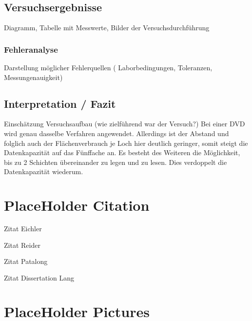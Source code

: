 \documentclass[9pt,twocolumn,twoside]{pnas-new}
\begin{document}
\section*{Versuchsergebnisse}
Diagramm, Tabelle mit Messwerte, Bilder der Versuchsdurchführung

\subsection*{Fehleranalyse}
Darstellung möglicher Fehlerquellen ( Laborbedingungen, Toleranzen, Messungenauigkeit)

\section*{Interpretation / Fazit}

Einschätzung Versuchsaufbau (wie zielführend war der Versuch?)
Bei einer DVD wird genau dasselbe Verfahren angewendet. Allerdings ist der Abstand und folglich auch der Flächenverbrauch je Loch hier deutlich geringer, somit steigt die Datenkapazität auf das Fünffache an. Es besteht des Weiteren die Möglichkeit, bis zu 2 Schichten übereinander zu legen und zu lesen. Dies verdoppelt die Datenkapazität wiederum.







\chapter{PlaceHolder Citation}

Zitat Eichler \cite[page example nr]{Eichler2015}

Zitat Reider \cite{Reider2012}

Zitat Patalong \cite{Patalong2007}

Zitat Dissertation Lang \cite{Lang1997}



\chapter{PlaceHolder Pictures}
\end{document}

